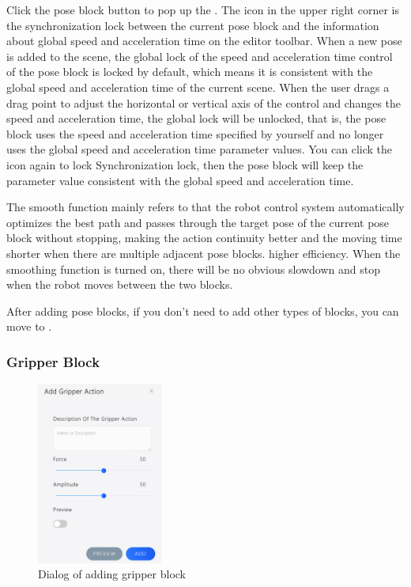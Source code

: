 Click the pose block  button to pop up the . The icon  in the upper right corner is the synchronization lock between the current pose block and the information about global speed and acceleration time on the editor toolbar. When a new pose is added to the scene, the global lock of the speed and acceleration time control of the pose block is locked by default, which means it is consistent with the global speed and acceleration time of the current scene. When the user drags a drag point to adjust the horizontal or vertical axis of the control and changes the speed and acceleration time, the global lock will be unlocked, that is, the pose block uses the speed and acceleration time specified by yourself and no longer uses the global speed and acceleration time parameter values. You can click the icon  again to lock Synchronization lock, then the pose block will keep the parameter value consistent with the global speed and acceleration time.

The smooth function mainly refers to that the robot control system automatically optimizes the best path and passes through the target pose of the current pose block without stopping, making the action continuity better and the moving time shorter when there are multiple adjacent pose blocks. higher efficiency. When the smoothing function is turned on, there will be no obvious slowdown and stop when the robot moves between the two blocks.

After adding pose blocks, if you don't need to add other types of blocks, you can move to .

\subsubsection{Gripper Block}

\begin{figure}[htb]
	\centering
	\includegraphics[height=6cm]{en/image/3-12.png}
	\caption{Dialog of adding gripper block}
	\label{fig:添加手爪动作对话框}
\end{figure}

